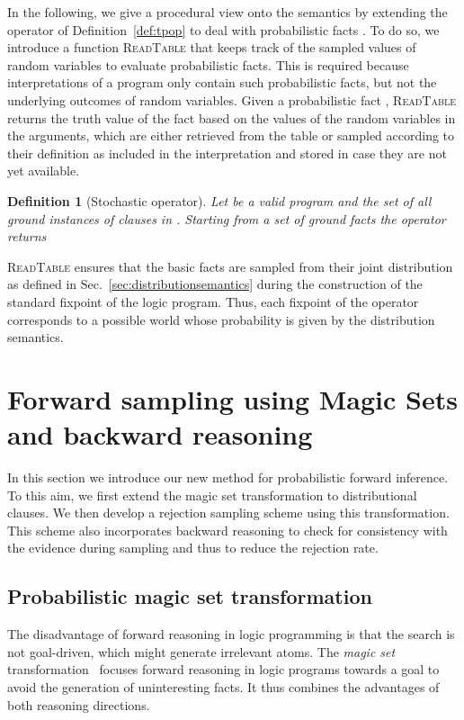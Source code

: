 \documentclass{tlp}
\newtheorem{definition}{Definition}
\begin{document}
In the following, we give a procedural view onto the semantics by
extending the  operator of Definition~\ref{def:tpop} to deal with
probabilistic facts . To do so, we
introduce a function \textsc{ReadTable} that keeps track of
the sampled values of random variables to evaluate probabilistic
facts. This is required because interpretations of a program only
contain such probabilistic facts, but not the underlying outcomes of
random variables. Given a probabilistic fact
, \textsc{ReadTable} returns the truth
value of the fact based on the values of the random variables  in
the arguments, which are either retrieved from the table or sampled
according to their definition  as included
in the interpretation and stored in case they are not yet available.

\begin{definition}[Stochastic  operator]
  \label{def:stp}
  Let  be a valid program and  the set of all ground
  instances of clauses in .  Starting from a set of ground facts
   the  operator returns
  
\end{definition}

\textsc{ReadTable} ensures that the basic facts are sampled from their
joint distribution as defined in Sec.~\ref{sec:distributionsemantics} during the
construction of the standard fixpoint of the logic program. Thus, each
fixpoint of the  operator corresponds to a possible
world whose probability is given by the distribution semantics.
 

\section{Forward sampling using Magic Sets and backward reasoning}
\label{sec:algorithms} 

In this section we introduce our new method for probabilistic forward
inference.  To this aim, we first extend the magic set transformation
to distributional clauses. We then develop a rejection sampling scheme
using this transformation. This scheme also incorporates backward
reasoning to check for consistency with the evidence during sampling
and thus to reduce the rejection rate.

\subsection{Probabilistic magic set transformation}
\label{sec:magic}

The disadvantage of forward reasoning in logic programming is that the
search is not goal-driven, which might generate irrelevant atoms.  The
\emph{magic set} transformation~\cite{bancilhon,nilsson:book} focuses
forward reasoning in logic programs towards a goal to avoid the
generation of uninteresting facts. It thus combines the advantages of
both reasoning directions.
\end{document}
